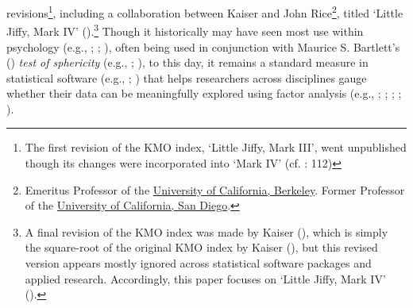 \documentclass[
  10pt,
  a4paper,
  twoside]{article}
\begin{document}
revisions\footnote{The first revision of the KMO index, `Little Jiffy, Mark III', went unpublished though its changes were incorporated into `Mark IV' (cf. : 112)}, including a collaboration between Kaiser and John Rice\footnote{Emeritus Professor of the \href{https://www.berkeley.edu/}{University of California, Berkeley}. Former Professor of the \href{https://ucsd.edu/}{University of California, San Diego}.}, titled `Little Jiffy, Mark IV' ().\footnote{A final revision of the KMO index was made by Kaiser (), which is simply the square-root of the original KMO index by Kaiser (), but this revised version appears mostly ignored across statistical software packages and applied research. Accordingly, this paper focuses on `Little Jiffy, Mark IV' ().} Though it historically may have seen most use within psychology (e.g., ; ; ), often being used in conjunction with Maurice S. Bartlett's () \emph{test of sphericity} (e.g., ; ), to this day, it remains a standard measure in statistical software (e.g., ; ) that helps researchers across disciplines gauge whether their data can be meaningfully explored using factor analysis (e.g., ; ; ; ; ).
\end{document}
